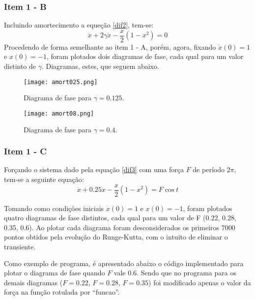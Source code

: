 \documentclass[a4paper,11pt, twoside]{article}
\begin{document}
    \subsubsection*{Item 1 - B}
    Incluindo amortecimento a equeção \eqref{dif2}, tem-se:
    \begin{equation}\label{dif3}
        \ddot{x} + 2\gamma\dot{x} - \frac{x}{2}(1 - x^2) = 0
    \end{equation}
    Procedendo de forma semelhante ao item 1 - A, porém, agora, fixando $\dot{x}(0) = 1$
    e $x(0) = -1$, foram plotados dois diagramas de fase, cada qual para um valor distinto de
    $\gamma$. Diagramas, estes,  que seguem abaixo.
    \begin{figure}[!ht]
        \centering
        \texttt{[image: amort025.png]}
        \caption{Diagrama de fase para $\gamma = 0.125$.\label{025}}
    \end{figure}
    \begin{figure}[!ht]
        \centering
        \texttt{[image: amort08.png]}
        \caption{Diagrama de fase para $\gamma = 0.4$.\label{08}}
    \end{figure}
    
    \subsubsection*{Item 1 - C}
    Forçando o sistema dado pela equação \eqref{dif3} com uma força $F$ de período $2\pi$, tem-se
    a seguinte equação:
    \begin{equation}\label{dif4}
        \ddot{x} + 0.25\dot{x} - \frac{x}{2}(1 - x^2) = F\cos{t}
    \end{equation}
    
    Tomando como condições iniciais $\dot{x}(0) = 1$ e $x(0) = -1$, foram
    plotados quatro diagramas de fase distintos, cada qual para um valor de F (0.22, 0.28, 0.35, 0.6).
    Ao plotar cada diagrama foram desconsiderados os primeiros 7000 pontos obtidos
    pela evolução do Runge-Kutta, com o intuito de eliminar o transiente.
    
    Como exemplo de programa, é apresentado abaixo o código implementado para plotar
    o diagrama de fase quando $F$ vale 0.6. Sendo que no programa para os demais diagramas ($F = 0.22$, $F = 0.28$, $F = 0.35$)
    foi modificado apenas o valor da força na função rotulada por ``funcao''.
    \newpage
    {\linespread{1.15}
    }
    
\end{document}
